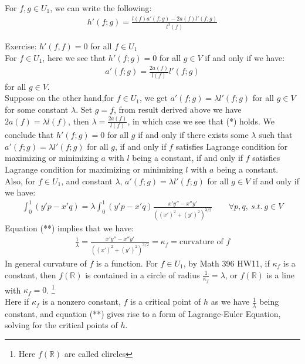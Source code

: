 \documentclass[15pt]{book}
\theoremstyle{break}
\theoremstyle{break}
\newcommand{\R}{\mathbb{R}}
\newcommand{\exercise}{\color{green}Exercise: \color{black}}
\begin{document}
For $f,g \in U_1$, we can write the following:
\begin{align*}
h'(f;g) = \frac{l(f)a'(f;g)-2a(f)l'(f;g)}{l^3(f)}
\end{align*} 

\exercise $h'(f,f) = 0$ for all $f \in U_1$\\

For $f \in U_1$, here we see that $h'(f;g) = 0$ for all $g \in V$ if and only if we have:
\begin{align*}
a'(f;g) = \frac{2a(f)}{l(f)}l'(f;g) \tag{*}
\end{align*}
for all $g \in V$. \\

Suppose on the other hand,for $f \in U_1$, we get $a'(f;g) = \lambda l'(f;g)$ for all $g \in V$ for some constant $\lambda$. Set $g = f$, from result derived above we have $2a(f) = \lambda l(f)$, then $\lambda = \frac{2a(f)}{l(f)}$, in which case we see that (*) holds. We conclude that $h'(f;g) = 0$ for all $g$ if and only if there exists some $\lambda$ such that $a'(f;g) = \lambda l'(f;g)$ for all $g$, if and only if $f$ satisfies Lagrange condition for maximizing or minimizing $a$ with $l$ being a constant, if and only if $f$ satisfies Lagrange condition for maximizing or minimizing $l$ with $a$ being a constant. \\

Also, for $f \in U_1$, and constant $\lambda$, $a'(f;g) = \lambda l'(f;g)$ for all $g \in V$ if and only if we have:
\begin{align*}
\int_0^1 (y'p - x'q) = \lambda \int_0^1 (y'p - x'q)\frac{x'y''-x''y'}{((x')^2 + (y')^2)^{3/2}} \qquad \forall p,q,\ s.t.\ g\in V \tag{**}
\end{align*}
Equation (**) implies that we have:
\begin{align*}
\frac{1}{\lambda} = \frac{x'y'' - x''y'}{((x')^2 + (y')^2)^{3/2}} = \kappa_f =\text{curvature of }f 
\end{align*}
In general curvature of $f$ is a function. For $f \in U_1$, by Math 396 HW11, if $\kappa_f $ is a constant, then $f(\R)$ is contained in a circle of radius $\frac{1}{\kappa_f} = \lambda$, or $f(\R)$ is a line with $\kappa_f = 0$. \footnote{Here $f(\R)$ are called clircles} \\

Here if $\kappa_f$ is a nonzero constant, $f$ is a critical point of $h$ as we have $\frac{1}{\lambda}$ being constant, and equation (**) gives rise to a form of Lagrange-Euler Equation, solving for the critical points of $h$.\\
\end{document}
